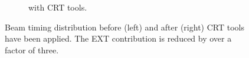 \begin{figure}[ht]
\begin{center}
\begin{subfigure}[b]{0.4\textwidth}
    \caption{\label{fig:crt:post} with CRT tools.}
    \end{subfigure}
\caption{\label{fig:crt} Beam timing distribution before (left) and after (right) CRT tools have been applied. The EXT contribution is reduced by over a factor of three.}
\end{center}
\end{figure}